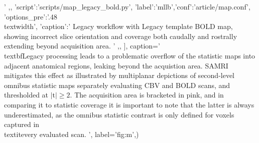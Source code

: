 {{                                '
			,},
		{'script':'scripts/map_legacy_bold.py', 'label':'mllb','conf':'article/map.conf', 'options_pre':'{.48\\textwidth}',
			'caption':'
				Legacy workflow with Legacy template BOLD map, showing incorrect slice orientation and coverage both caudally and rostrally extending beyond acquisition area.
			        '
                        ,},
		],
	caption='
                \\textbf{Legacy processing leads to a problematic overflow of the statistic maps into adjacent anatomical regions, leaking beyond the acquistion area.}
                SAMRI mitigates this effect as illustrated by multiplanar depictions of second-level omnibus statistic maps separately evaluating CBV and BOLD scans, and thresholded at $\mathrm{|t|\geq2}$.
                The acquisition area is bracketed in pink, and in comparing it to statistic coverage it is important to note that the latter is always underestimated, as the omnibus statistic contrast is only defined for voxels captured in \\textit{every} evaluated scan.
                ',
	label='fig:m',)}
